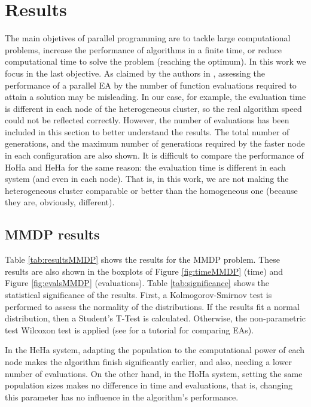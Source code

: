 \documentclass[final,1p,times]{elsarticle}
\begin{document}

\section{Results}
\label{sec:results}

The main objetives of parallel programming are to tackle large computational problems, increase the performance of algorithms in a finite time, or reduce computational time to solve the problem (reaching the optimum). In this work we focus in the last objective.
As claimed by the authors in \cite{EVALUATIONPARALLEL}, assessing the performance of a parallel EA by the number of function evaluations required to attain a solution may be misleading. In our case, for example, the evaluation time is different in each node of the heterogeneous cluster, so the real algorithm speed could not be reflected correctly. However, the number of evaluations has been included in this section to better understand the results. The total number of generations, and the maximum number of generations required by the faster node in each configuration are also shown. It is difficult to compare the performance of HoHa and HeHa for the same reason: the evaluation time is different in each system (and even in each node). That is, in this work, we are not making the heterogeneous cluster comparable or better than the homogeneous one (because they are, obviously, different).

\subsection{MMDP results}

Table \ref{tab:resultsMMDP} shows the results for the MMDP problem. These results are also shown in the boxplots of Figure \ref{fig:timeMMDP} (time) and Figure \ref{fig:evalsMMDP} (evaluations). Table \ref{tab:significance} shows the statistical significance of the results. First, a Kolmogorov-Smirnov test is performed to assess the normality of the distributions. If the results fit a normal distribution, then a Student's T-Test is calculated. Otherwise, the non-parametric test Wilcoxon test is applied (see \cite{TUTORIAL} for a tutorial for comparing EAs).

 In the HeHa system, adapting the population to the computational
 power of each node makes the algorithm finish significantly earlier,
 and also, needing a lower number of evaluations. On the other hand, in the HoHa system,
 setting the same population sizes makes no difference in time and
 evaluations, that is, changing this parameter has no influence in the
 algorithm's performance.  
\end{document}
